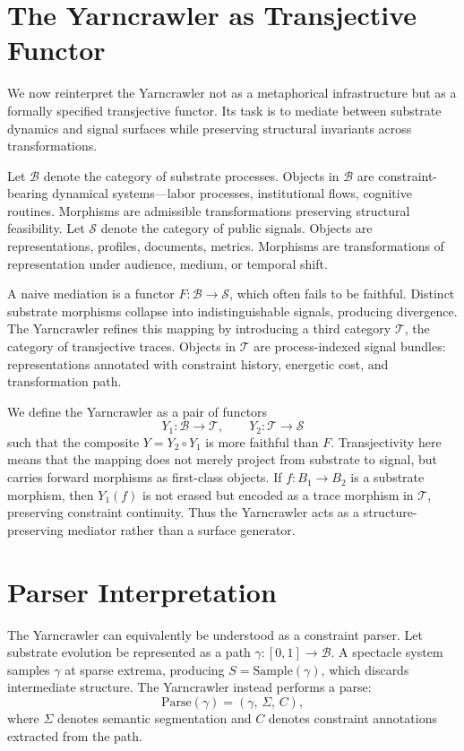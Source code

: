 \documentclass[11pt]{article}
\begin{document}
\section{The Yarncrawler as Transjective Functor}

We now reinterpret the Yarncrawler not as a metaphorical infrastructure but as a formally specified transjective functor. Its task is to mediate between substrate dynamics and signal surfaces while preserving structural invariants across transformations.

Let $\mathcal{B}$ denote the category of substrate processes. Objects in $\mathcal{B}$ are constraint-bearing dynamical systems---labor processes, institutional flows, cognitive routines. Morphisms are admissible transformations preserving structural feasibility. Let $\mathcal{S}$ denote the category of public signals. Objects are representations, profiles, documents, metrics. Morphisms are transformations of representation under audience, medium, or temporal shift.

A naive mediation is a functor $F : \mathcal{B} \to \mathcal{S}$, which often fails to be faithful. Distinct substrate morphisms collapse into indistinguishable signals, producing divergence. The Yarncrawler refines this mapping by introducing a third category $\mathcal{T}$, the category of transjective traces. Objects in $\mathcal{T}$ are process-indexed signal bundles: representations annotated with constraint history, energetic cost, and transformation path.

We define the Yarncrawler as a pair of functors
\[
Y_1 : \mathcal{B} \to \mathcal{T}, \qquad Y_2 : \mathcal{T} \to \mathcal{S}
\]
such that the composite $Y = Y_2 \circ Y_1$ is more faithful than $F$. Transjectivity here means that the mapping does not merely project from substrate to signal, but carries forward morphisms as first-class objects. If $f : B_1 \to B_2$ is a substrate morphism, then $Y_1(f)$ is not erased but encoded as a trace morphism in $\mathcal{T}$, preserving constraint continuity. Thus the Yarncrawler acts as a structure-preserving mediator rather than a surface generator.

\section{Parser Interpretation}

The Yarncrawler can equivalently be understood as a constraint parser. Let substrate evolution be represented as a path $\gamma : [0,1] \to \mathcal{B}$. A spectacle system samples $\gamma$ at sparse extrema, producing $S = \mathrm{Sample}(\gamma)$, which discards intermediate structure. The Yarncrawler instead performs a parse:
\[
\mathrm{Parse}(\gamma) = (\gamma,\, \Sigma,\, C),
\]
where $\Sigma$ denotes semantic segmentation and $C$ denotes constraint annotations extracted from the path.
\end{document}
